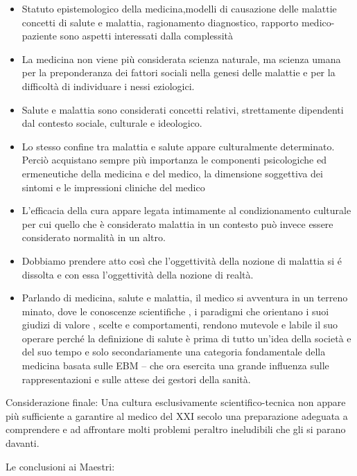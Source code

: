 \begin{itemize}
\item
  Statuto epistemologico della medicina,modelli di causazione delle
  malattie concetti di salute e malattia, ragionamento diagnostico,
  rapporto medico-paziente sono aspetti interessati dalla complessità
\item
  La medicina non viene più considerata scienza naturale, ma scienza
  umana per la preponderanza dei fattori sociali nella genesi delle
  malattie e per la difficoltà di individuare i nessi eziologici.
\item
  Salute e malattia sono considerati concetti relativi, strettamente
  dipendenti dal contesto sociale, culturale e ideologico.
\item
  Lo stesso confine tra malattia e salute appare culturalmente
  determinato. Perciò acquistano sempre più importanza le componenti
  psicologiche ed ermeneutiche della medicina e del medico, la
  dimensione soggettiva dei sintomi e le impressioni cliniche del medico
\item
  L'efficacia della cura appare legata intimamente al condizionamento
  culturale per cui quello che è considerato malattia in un contesto può
  invece essere considerato normalità in un altro.
\item
  Dobbiamo prendere atto così che l'oggettività della nozione di
  malattia si é dissolta e con essa l'oggettività della nozione di
  realtà.
\item
  Parlando di medicina, salute e malattia, il medico si avventura in un
  terreno minato, dove le conoscenze scientifiche , i paradigmi che
  orientano i suoi giudizi di valore , scelte e comportamenti, rendono
  mutevole e labile il suo operare perché la definizione di salute è
  prima di tutto un'idea della società e del suo tempo e solo
  secondariamente una categoria fondamentale della medicina basata sulle
  EBM -- che ora esercita una grande influenza sulle rappresentazioni e
  sulle attese dei gestori della sanità.
\end{itemize}
  Considerazione finale: Una cultura esclusivamente scientifico-tecnica
  non appare più sufficiente a garantire al medico del XXI secolo una
  preparazione adeguata a comprendere e ad affrontare molti problemi
  peraltro ineludibili che gli si parano davanti.

  Le conclusioni ai Maestri:

